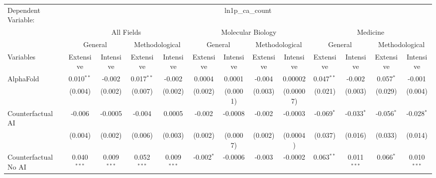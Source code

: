 \begingroup
\centering
\begin{tabular}{lcccccccccccc}
   \tabularnewline \midrule \midrule
   Dependent Variable: & \multicolumn{12}{c}{ln1p\_ca\_count}\\
 & \multicolumn{4}{c}{All Fields} & \multicolumn{4}{c}{Molecular Biology} & \multicolumn{4}{c}{Medicine} \\
\cmidrule(lr){2-5} \cmidrule(lr){6-9} \cmidrule(lr){10-13}
 & \multicolumn{2}{c}{General} & \multicolumn{2}{c}{Methodological} & \multicolumn{2}{c}{General} & \multicolumn{2}{c}{Methodological} & \multicolumn{2}{c}{General} & \multicolumn{2}{c}{Methodological} \\
\cmidrule(lr){2-3} \cmidrule(lr){4-5} \cmidrule(lr){6-7} \cmidrule(lr){8-9} \cmidrule(lr){10-11} \cmidrule(lr){12-13}
Variables & \multicolumn{1}{c}{Extensive} & \multicolumn{1}{c}{Intensive} & \multicolumn{1}{c}{Extensive} & \multicolumn{1}{c}{Intensive} & \multicolumn{1}{c}{Extensive} & \multicolumn{1}{c}{Intensive} & \multicolumn{1}{c}{Extensive} & \multicolumn{1}{c}{Intensive} & \multicolumn{1}{c}{Extensive} & \multicolumn{1}{c}{Intensive} & \multicolumn{1}{c}{Extensive} & \multicolumn{1}{c}{Intensive} \\
\cmidrule(lr){1-1}\cmidrule(lr){2-2} \cmidrule(lr){3-3} \cmidrule(lr){4-4} \cmidrule(lr){5-5} \cmidrule(lr){6-6} \cmidrule(lr){7-7} \cmidrule(lr){8-8} \cmidrule(lr){9-9} \cmidrule(lr){10-10} \cmidrule(lr){11-11} \cmidrule(lr){12-12} \cmidrule(lr){13-13}
   AlphaFold                                & 0.010$^{**}$  & -0.002        & 0.017$^{**}$  & -0.002        & 0.0004       & 0.0001         & -0.004  & 0.00002   & 0.047$^{**}$ & -0.002        & 0.057$^{*}$  & -0.001\\   
                                            & (0.004)       & (0.002)       & (0.007)       & (0.002)       & (0.002)      & (0.0001)       & (0.003) & (0.00007) & (0.021)      & (0.003)       & (0.029)      & (0.004)\\   
   Counterfactual AI                        & -0.006        & -0.0005       & -0.004        & 0.0005        & -0.002       & -0.0008        & -0.002  & -0.0003   & -0.069$^{*}$ & -0.033$^{*}$  & -0.056$^{*}$ & -0.028$^{*}$\\   
                                            & (0.004)       & (0.002)       & (0.006)       & (0.003)       & (0.002)      & (0.0007)       & (0.002) & (0.0004)  & (0.037)      & (0.016)       & (0.033)      & (0.014)\\   
   Counterfactual No AI                     & 0.040$^{***}$ & 0.009$^{***}$ & 0.052$^{***}$ & 0.009$^{***}$ & -0.002$^{*}$ & -0.0006        & -0.003  & -0.0002   & 0.063$^{**}$ & 0.011$^{***}$ & 0.066$^{*}$  & 0.010$^{***}$\\   

\end{tabular}
